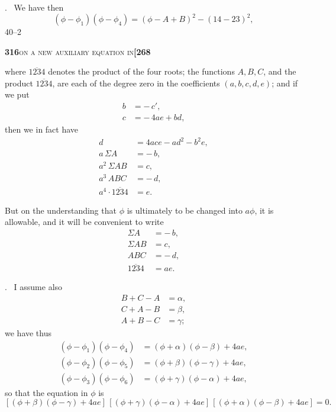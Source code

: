 \documentclass[11pt]{article}
\begin{document}
\medskip

. \ We have then
\[
   (\phi - \phi_1)(\phi - \phi_4) = (\phi - A + B)^2 - (14 - 23)^2,
\]
\hfill 40--2

\newpage
\setcounter{page}{316}

\noindent\textbf{316}\hfill\textsc{on a new auxiliary equation in}\hfill\textbf{[268}

\medskip

\noindent where $\overline{1234}$ denotes the product of the four roots; the functions $A, B, C$, and the product $\overline{1234}$, are each of the degree zero in the coefficients $(a, b, c, d, e)$; and if we put
\[
\begin{aligned}
   b &= -\,c',\\
   c &= -\,4 a e + b d,
\end{aligned}
\]
then we in fact have
\[
\begin{aligned}
   d &= 4 a c e - a d^2 - b^2 e,\\
   a\,\Sigma A &= -\,b,\\
   a^2\,\Sigma A B &= c,\\
   a^3\,A B C &= -\,d,\\
   a^4\cdot\overline{1234} &= e.
\end{aligned}
\]

\medskip

\noindent But on the understanding that $\phi$ is ultimately to be changed into $a\phi$, it is allowable, and it will be convenient to write
\[
\begin{aligned}
   \Sigma A &= -\,b,\\
   \Sigma A B &= c,\\
   A B C &= -\,d,\\
   \overline{1234} &= a e.
\end{aligned}
\]

\medskip

. \ I assume also
\[
\begin{aligned}
   B + C - A &= \alpha,\\
   C + A - B &= \beta,\\
   A + B - C &= \gamma;
\end{aligned}
\]
we have thus
\[
\begin{aligned}
   (\phi - \phi_1)(\phi - \phi_4) &= (\phi + \alpha)(\phi - \beta) + 4 a e,\\
   (\phi - \phi_2)(\phi - \phi_5) &= (\phi + \beta)(\phi - \gamma) + 4 a e,\\
   (\phi - \phi_3)(\phi - \phi_6) &= (\phi + \gamma)(\phi - \alpha) + 4 a e,
\end{aligned}
\]
so that the equation in $\phi$ is
\[
   [(\phi + \beta)(\phi - \gamma) + 4 a e]\,[(\phi + \gamma)(\phi - \alpha) + 4 a e]\,[(\phi + \alpha)(\phi - \beta) + 4 a e] = 0.
\]
\end{document}
